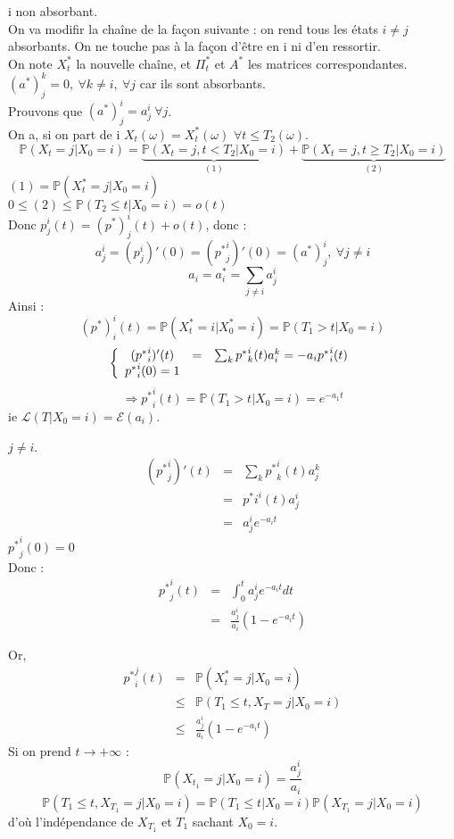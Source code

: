 \begin{dem}
i non absorbant.\\
On va modifir la chaîne de la façon suivante : on rend tous les états $i\neq j$ absorbants. On ne touche pas à la façon d'être en i ni d'en ressortir.\\
On note $X_t^*$ la nouvelle chaîne, et $\Pi_t^*$ et $A^*$ les matrices correspondantes.\\
$(a^*)_j^k=0,\ \forall k\neq i,\ \forall j$ car ils sont absorbants.\\

\bigskip
Prouvons que $(a^*)_j^i=a^i_j\ \forall j$.\\
On a, si on part de i $X_t(\omega)=X^*_t(\omega)$ $\forall t\leq T_2(\omega)$. 
\[\mathbb{P}(X_t=j|X_0=i)=\underbrace{\mathbb{P}(X_t=j,t<T_2|X_0=i)}_{(1)}+\underbrace{\mathbb{P}(X_t=j,t\geq T_2|X_0=i)}_{(2)}\]
$(1)=\mathbb{P}(X^*_t=j|X_0=i)$\\
$0\leq (2)\leq \mathbb{P}(T_2\leq t|X_0=i)=o(t)$\\
Donc $p_j^i(t)=(p^*)_j^i(t)+o(t)$, donc :
	\[a_j^i=(p^i_j)'(0)=({p^*}^i_j)'(0)=(a^*)_j^i,\ \forall j\neq i\]
	\[a_i=a^*_i=\sum_{j\neq i} a_j^i\]
Ainsi :
\[(p^*)_i^i(t)=\mathbb{P}(X_t^*=i|X_0^*=i)=\mathbb{P}(T_1>t|X_0=i)\]
\[\left\{\begin{array}{c c c}
({p^*}^i_i)'(t)&=&\sum_k {p^*}_k^i(t)a_i^k = -a_i{p^*}^i_i(t)\\
{p^*}^i_i(0)=1
\end{array}\right.\]
\[\Rightarrow {p^*}^i_i(t)=\mathbb{P}(T_1>t|X_0=i)=e^{-a_1t}\]
ie $\mathcal{L}(T|X_0=i)=\mathcal{E}(a_i)$.

\bigskip
$j\neq i$. \begin{eqnarray*}
	({p^*}^i_j)'(t)&=&\sum_k {p^*}^i_k(t)a_j^k \\
			&=&{p^*}i^i(t)a_j^i\\
			&=&a_j^ie^{-a_it}
\end{eqnarray*}
${p^*}^i_j(0)=0$\\
Donc : \begin{eqnarray*}
{p^*}^i_j(t)&=&\int_0^t a_j^i e^{-a_it}dt\\
	&=&\frac{a_j^i}{a_i}(1-e^{-a_it})
\end{eqnarray*}

Or,
\begin{eqnarray*}
	{p^*}_i^j(t)&=&\mathbb{P}(X_t^*=j|X_0=i)\\
		&\leq& \mathbb{P}(T_1\leq t, X_T=j | X_0=i)\\
		&\leq& \frac{a_j^i}{a_i}(1-e^{-a_it})
\end{eqnarray*}
Si on prend $t\to +\infty$ :
	\[\mathbb{P}(X_{t_1}=j|X_0=i)=\frac{a_j^i}{a_i}\]
\[\mathbb{P}(T_1\leq t, X_{T_1}=j|X_0=i)=\mathbb{P}(T_1\leq t|X_0=i)\mathbb{P}(X_{T_1}=j|X_0=i)\]
d'où l'indépendance de $X_{T_1}$ et $T_1$ sachant $X_0=i$.
\end{dem}

